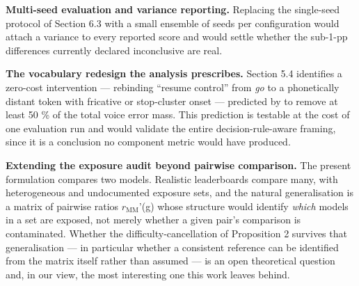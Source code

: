 \textbf{Multi-seed evaluation and variance reporting.} Replacing the single-seed protocol of Section 6.3 with a small ensemble of seeds per configuration would attach a variance to every reported score and would settle whether the sub-1-pp differences currently declared inconclusive are real.

\textbf{The vocabulary redesign the analysis prescribes.} Section 5.4 identifies a zero-cost intervention --- rebinding ``resume control'' from \emph{go} to a phonetically distant token with fricative or stop-cluster onset --- predicted by  to remove at least 50 \% of the total voice error mass. This prediction is testable at the cost of one evaluation run and would validate the entire decision-rule-aware framing, since it is a conclusion no component metric would have produced.

\textbf{Extending the exposure audit beyond pairwise comparison.} The present formulation compares two models. Realistic leaderboards compare many, with heterogeneous and undocumented exposure sets, and the natural generalisation is a matrix of pairwise ratios $r_{\mathrm{MM}}$'(g) whose structure would identify \emph{which} models in a set are exposed, not merely whether a given pair's comparison is contaminated. Whether the difficulty-cancellation of Proposition 2 survives that generalisation --- in particular whether a consistent reference can be identified from the matrix itself rather than assumed --- is an open theoretical question and, in our view, the most interesting one this work leaves behind.
